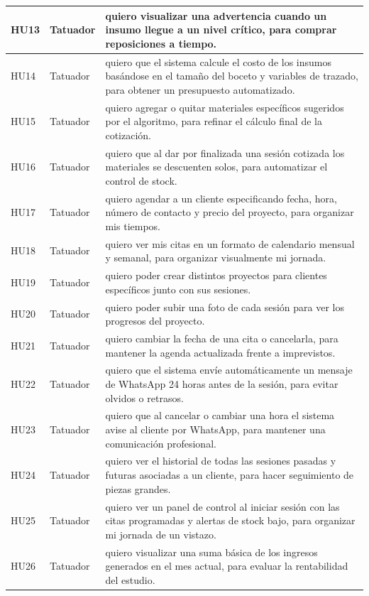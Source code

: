 \begin{longtable}{|l|p{3.5cm}|p{9.5cm}|}
  HU13 & Tatuador & quiero visualizar una advertencia cuando un insumo llegue a un nivel crítico, para comprar reposiciones a tiempo. \\ \hline
  HU14 & Tatuador & quiero que el sistema calcule el costo de los insumos basándose en el tamaño del boceto y variables de trazado, para obtener un presupuesto automatizado. \\ \hline
  HU15 & Tatuador & quiero agregar o quitar materiales específicos sugeridos por el algoritmo, para refinar el cálculo final de la cotización. \\ \hline
  HU16 & Tatuador & quiero que al dar por finalizada una sesión cotizada los materiales se descuenten solos, para automatizar el control de stock. \\ \hline
  HU17 & Tatuador & quiero agendar a un cliente especificando fecha, hora, número de contacto y precio del proyecto, para organizar mis tiempos. \\ \hline
  HU18 & Tatuador & quiero ver mis citas en un formato de calendario mensual y semanal, para organizar visualmente mi jornada. \\ \hline
  HU19 & Tatuador & quiero poder crear distintos proyectos para clientes específicos junto con sus sesiones. \\ \hline
  HU20 & Tatuador & quiero poder subir una foto de cada sesión para ver los progresos del proyecto. \\ \hline
  HU21 & Tatuador & quiero cambiar la fecha de una cita o cancelarla, para mantener la agenda actualizada frente a imprevistos. \\ \hline
  HU22 & Tatuador & quiero que el sistema envíe automáticamente un mensaje de WhatsApp 24 horas antes de la sesión, para evitar olvidos o retrasos. \\ \hline
  HU23 & Tatuador & quiero que al cancelar o cambiar una hora el sistema avise al cliente por WhatsApp, para mantener una comunicación profesional. \\ \hline
  HU24 & Tatuador & quiero ver el historial de todas las sesiones pasadas y futuras asociadas a un cliente, para hacer seguimiento de piezas grandes. \\ \hline
  HU25 & Tatuador & quiero ver un panel de control al iniciar sesión con las citas programadas y alertas de stock bajo, para organizar mi jornada de un vistazo. \\ \hline
  HU26 & Tatuador & quiero visualizar una suma básica de los ingresos generados en el mes actual, para evaluar la rentabilidad del estudio. \\ \hline

\end{longtable}
